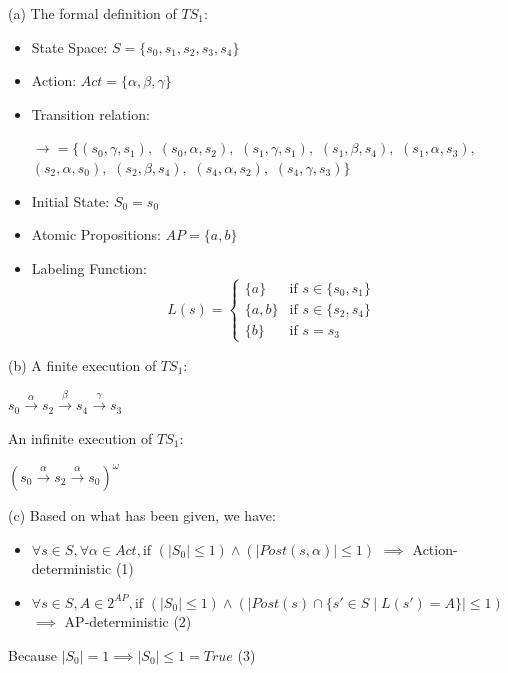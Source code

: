 \documentclass[a4paper,12pt]{article}
\begin{document}
(a) The formal definition of $TS_1$:
\begin{itemize}
    \item State Space: $S = \{s_0, s_1, s_2, s_3, s_4\}$
    \item Action: $Act = \{\alpha, \beta, \gamma\}$
    \item Transition relation: 
    \begin{center}
        $\to = \{(s_0, \gamma, s_1),$ $(s_0, \alpha, s_2),$ $(s_1, \gamma, s_1),$ $(s_1, \beta, s_4),$ $(s_1, \alpha, s_3),$
                $(s_2, \alpha, s_0),$ $(s_2, \beta, s_4),$ $(s_4, \alpha, s_2),$ $(s_4, \gamma, s_3)\}$
    \end{center}
    \item Initial State: $S_0 = {s_0}$
    \item Atomic Propositions: $AP = \{a, b\}$
    \item Labeling Function:
    \[
        L(s) = \begin{cases} 
            \{a\} & \text{if } s \in \{s_0, s_1\} \\
            \{a, b\} & \text{if } s \in \{s_2, s_4\} \\
            \{b\} & \text{if } s = s_3 
        \end{cases}
    \]
\end{itemize}

(b) A finite execution of $TS_1$:
    \begin{center}
        $s_0 \xrightarrow{\alpha} s_2 \xrightarrow{\beta} s_4 \xrightarrow{\gamma} s_3$
    \end{center}

An infinite execution of $TS_1$:
    \begin{center}
        $(s_0 \xrightarrow{\alpha} s_2 \xrightarrow{\alpha} s_0) ^ \omega$
    \end{center}

(c) Based on what has been given, we have:
\begin{itemize}
    \item $\forall s \in S, \forall \alpha \in Act, \text{if } (\left|S_0\right| \leq 1) \land (\left|Post(s, \alpha)\right| \leq 1)$ $\implies$ Action-deterministic (1)
    \item $\forall s \in S, A \in 2^{AP}, \text{if } (\left|S_0\right| \leq 1) \land (\left|Post(s) \cap \{s' \in S \mid L(s') = A\}\right| \leq 1)$ $\implies$ AP-deterministic (2)
\end{itemize}

Because $\left|S_0\right| = 1 \implies \left|S_0\right| \leq 1 = True$ (3)
\end{document}
